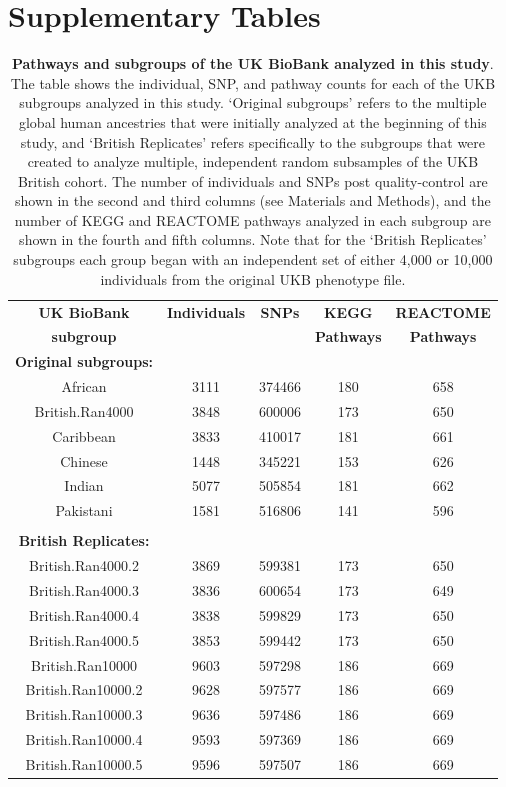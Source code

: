 \section{Supplementary Tables}\label{Supplementary-Tables}

\begin{table}[ht]
\centering
\begin{tabular}{ccccc}
  \hline
\textbf{UK BioBank} & \textbf{Individuals} & \textbf{SNPs} & \textbf{KEGG} & \textbf{REACTOME} \\
\textbf{subgroup} & & & \textbf{Pathways} & \textbf{Pathways}  \\
  \hline
\textbf{Original subgroups:} & & & & \\
African & 3111 & 374466 & 180 & 658 \\ 
British.Ran4000 & 3848 & 600006 & 173 & 650 \\ 
Caribbean & 3833 & 410017 & 181 & 661 \\ 
Chinese & 1448 & 345221 & 153 & 626 \\ 
Indian & 5077 & 505854 & 181 & 662 \\ 
Pakistani & 1581 & 516806 & 141 & 596 \\ 
\\
\textbf{British Replicates:} & & & & \\
British.Ran4000.2 & 3869 & 599381 & 173 & 650 \\ 
British.Ran4000.3 & 3836 & 600654 & 173 & 649 \\ 
British.Ran4000.4 & 3838 & 599829 & 173 & 650 \\ 
British.Ran4000.5 & 3853 & 599442 & 173 & 650 \\ 
British.Ran10000 & 9603 & 597298 & 186 & 669 \\ 
British.Ran10000.2 & 9628 & 597577 & 186 & 669 \\ 
British.Ran10000.3 & 9636 & 597486 & 186 & 669 \\ 
British.Ran10000.4 & 9593 & 597369 & 186 & 669 \\ 
British.Ran10000.5 & 9596 & 597507 & 186 & 669 \\ 
  \hline
\end{tabular}
\caption[TBD]{\textbf{Pathways and subgroups of the UK BioBank analyzed in this study}. The table shows the individual, SNP, and pathway counts for each of the UKB subgroups analyzed in this study. `Original subgroups' refers to the multiple global human ancestries that were initially analyzed at the beginning of this study, and `British Replicates' refers specifically to the subgroups that were created to analyze multiple, independent random subsamples of the UKB British cohort. The number of individuals and SNPs post quality-control are shown in the second and third columns (see Materials and Methods), and the number of KEGG and REACTOME pathways analyzed in each subgroup are shown in the fourth and fifth columns. Note that for the `British Replicates' subgroups each group began with an independent set of either 4,000 or 10,000 individuals from the original UKB phenotype file.}
\label{InterPath-Supp-Table-UKBPopStats}
\end{table}
\clearpage

